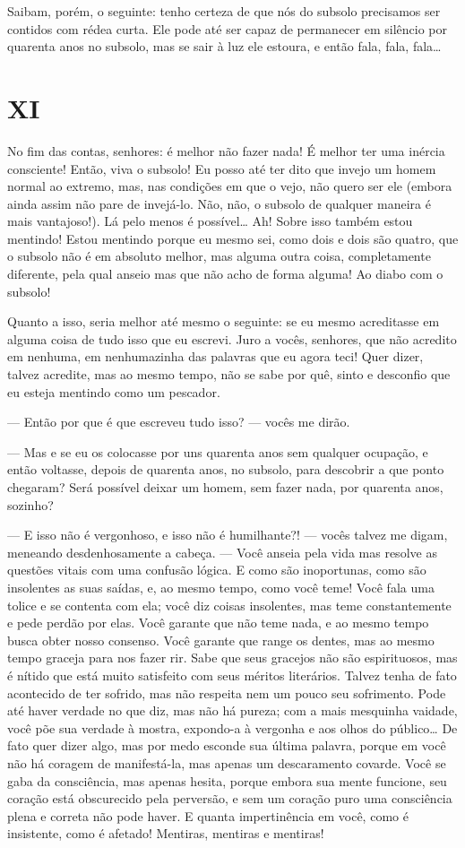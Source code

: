 Saibam, porém, o seguinte: tenho certeza de que nós do subsolo
precisamos ser contidos com rédea curta. Ele pode até ser capaz de
permanecer em silêncio por quarenta anos no subsolo, mas se sair à luz
ele estoura, e então fala, fala, fala\ldots{}


\section{XI}

No fim das contas, senhores: é melhor não fazer nada! É melhor ter uma
inércia consciente! Então, viva o subsolo! Eu posso até ter dito que
invejo um homem normal ao extremo, mas, nas condições em que o vejo,
não quero ser ele (embora ainda assim não pare de invejá-lo. Não, não,
o subsolo de qualquer maneira é mais vantajoso!). Lá pelo menos é
possível\ldots{} Ah! Sobre isso também estou mentindo! Estou mentindo porque
eu mesmo sei, como dois e dois são quatro, que o subsolo não é em
absoluto melhor, mas alguma outra coisa, completamente diferente, pela
qual anseio mas que não acho de forma alguma! Ao diabo com o subsolo!

Quanto a isso, seria melhor até mesmo o seguinte: se eu mesmo
acreditasse em alguma coisa de tudo isso que eu escrevi. Juro a vocês,
senhores, que não acredito em nenhuma, em nenhumazinha das palavras que
eu agora teci! Quer dizer, talvez acredite, mas ao mesmo tempo, não se
sabe por quê, sinto e desconfio que eu esteja mentindo como um
pescador.

--- Então por que é que escreveu tudo isso? --- vocês me dirão.

--- Mas e se eu os colocasse por uns quarenta anos sem qualquer ocupação,
e então voltasse, depois de quarenta anos, no subsolo, para descobrir a
que ponto chegaram? Será possível deixar um homem, sem fazer nada, por
quarenta anos, sozinho?

--- E isso não é vergonhoso, e isso não é humilhante?! --- vocês talvez me
digam, meneando desdenhosamente a cabeça. --- Você anseia pela vida mas
resolve as questões vitais com uma confusão lógica. E como são
inoportunas, como são insolentes as suas saídas, e, ao mesmo tempo,
como você teme! Você fala uma tolice e se contenta com ela; você diz
coisas insolentes, mas teme constantemente e pede perdão por elas. Você
garante que não teme nada, e ao mesmo tempo busca obter nosso consenso.
Você garante que range os dentes, mas ao mesmo tempo graceja para nos
fazer rir. Sabe que seus gracejos não são espirituosos, mas é nítido
que está muito satisfeito com seus méritos literários. Talvez tenha de
fato acontecido de ter sofrido, mas não respeita nem um pouco seu
sofrimento. Pode até haver verdade no que diz, mas não há pureza; com a
mais mesquinha vaidade, você põe sua verdade à mostra, expondo-a à
vergonha e aos olhos do público\ldots{} De fato quer dizer algo, mas por
medo esconde sua última palavra, porque em você não há coragem de
manifestá-la, mas apenas um descaramento covarde. Você se gaba da
consciência, mas apenas hesita, porque embora sua mente funcione, seu
coração está obscurecido pela perversão, e sem um coração puro uma
consciência plena e correta não pode haver. E quanta impertinência em
você, como é insistente, como é afetado! Mentiras, mentiras e mentiras!

